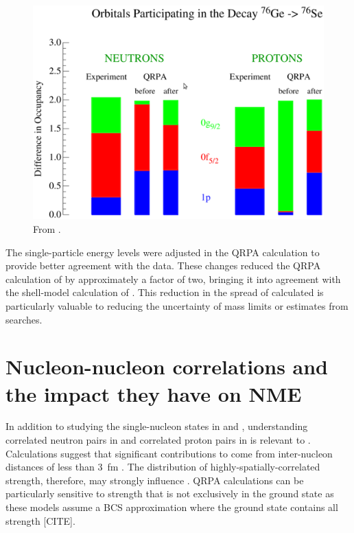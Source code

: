 \begin{figure}[htp]
\centering
\includegraphics[width=1.0\textwidth]{figures/occupancyDiffs.eps}
\caption{From \cite{schiffer_review}.}
\label{fig:occupancyDiffs}
\end{figure}
The single-particle energy levels were adjusted in the QRPA calculation \cite{SuhonenEnergyAdjust} to provide better agreement with the data.  These changes reduced the QRPA calculation of \NME by approximately a factor of two, bringing it into agreement with the shell-model calculation of \NME.  This reduction in the spread of calculated \NME is particularly valuable to reducing the uncertainty of mass limits or estimates from \zvbb searches. 


\section{Nucleon-nucleon correlations and the impact they have on NME}

In addition to studying the single-nucleon states in \GeTargets and \SeProducts, understanding correlated neutron pairs in  and correlated proton pairs in  is relevant to \NME.  Calculations suggest that significant contributions to \NME come from inter-nucleon distances of less than 3~fm \cite{anatomy}.  The distribution of highly-spatially-correlated \zp strength, therefore, may strongly influence \NME.  QRPA calculations can be particularly sensitive to \zp strength that is not exclusively in the ground state as these models assume a BCS approximation where the ground state contains all \zp strength [CITE]. 

